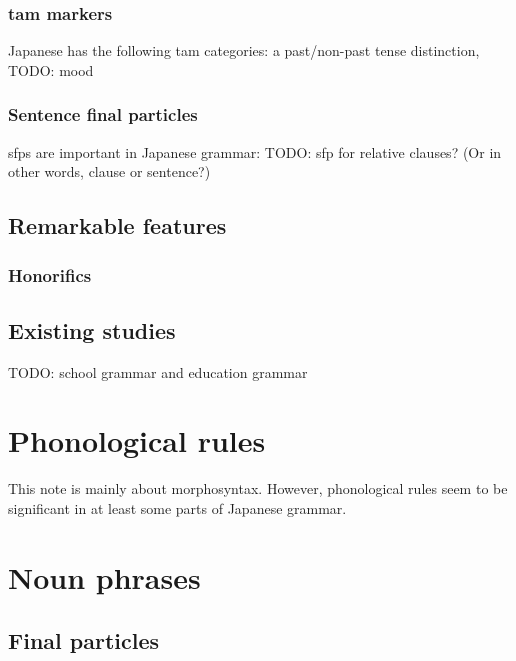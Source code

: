 \documentclass[UTF8, a4paper, oneside, scheme=plain]{ctexart}
\begin{document}
\subsubsection{\ac{tam} markers}

Japanese has the following \ac{tam} categories:
a past/non-past tense distinction,
TODO: mood

\subsubsection{Sentence final particles}

\acs{sfp}s are important in Japanese grammar:
TODO: sfp for relative clauses? (Or in other words, clause or sentence?)

\subsection{Remarkable features}

\subsubsection{Honorifics}

\subsection{Existing studies}

TODO: school grammar and education grammar

\section{Phonological rules}

This note is mainly about morphosyntax.
However, phonological rules seem to be significant in at least some parts of Japanese grammar.


\section{Noun phrases}

\subsection{Final particles}
\end{document}
